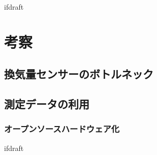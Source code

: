 \expandafter\ifx\csname ifdraft\endcsname\relax
 
\fi

\section{考察}

\subsection{換気量センサーのボトルネック}

\subsection{測定データの利用}

\subsubsection{オープンソースハードウェア化}

\expandafter\ifx\csname ifdraft\endcsname\relax
  
\fi
